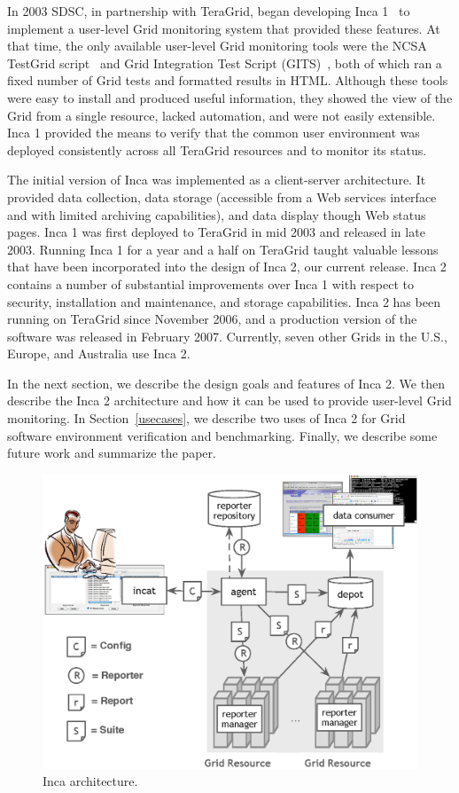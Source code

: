 \documentclass[times,10pt,twocolumn]{article}
\begin{document}

\noindent In 2003 SDSC, in partnership with TeraGrid, began developing Inca
1~\cite{inca1} to implement a user-level Grid monitoring system that provided
these features.  At that time, the only available user-level Grid
monitoring tools were the NCSA TestGrid script~\cite{ncsa-test} and
Grid Integration Test Script (GITS)~\cite{gits}, both of which ran a fixed number of Grid tests and formatted
results in HTML.  Although these tools were easy to install and produced
useful information, they showed the view of the Grid from a single
resource, lacked automation, and were not easily extensible.  Inca 1 provided
the means to verify that the common user environment was deployed consistently
across all TeraGrid resources and to monitor its status.

The initial
version of Inca was implemented as a client-server architecture.  It provided
data collection, data storage (accessible from a Web services interface and with 
limited archiving capabilities), and data display though Web status
pages.  Inca 1 was first deployed to TeraGrid in mid 2003 and released in late
2003. Running Inca 1 for a year and a half on TeraGrid taught 
valuable lessons that have been incorporated into the design of Inca 2, our
current release.  Inca 2
contains a number of substantial improvements over Inca 1 with respect to
security, installation and maintenance, and storage capabilities.  Inca 2 has
been running on TeraGrid since November 2006, and a production
version of the software was released in February 2007.  Currently, seven other Grids in the
U.S., Europe, and Australia use Inca 2.  

In the next section, we describe the design goals and features of Inca 2. 
We then describe the Inca 2 architecture and how it can be used to provide
user-level Grid monitoring.  In Section~\ref{usecases}, we describe two 
uses of Inca 2 for Grid software environment verification and benchmarking.  
Finally, we describe some future work and summarize the paper.

  
\begin{figure}[tbp]
  \centering
  \includegraphics[width=.6\textwidth]{arch.eps}
  \caption{\label{arch_fig} Inca architecture.}
\end{figure}
\end{document}
